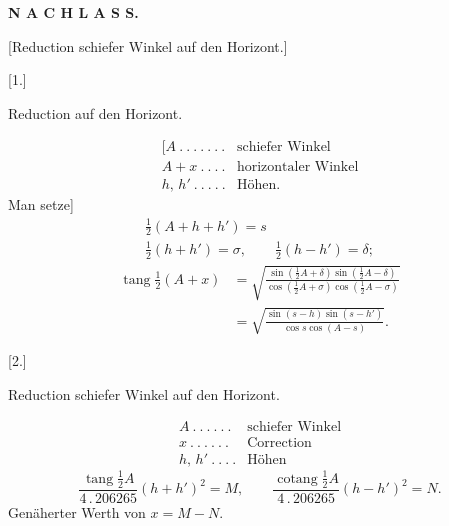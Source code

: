 \par\clearpage\null\clearpage
\begin{center}
{\Large\textbf{N A C H L A S S.}}\par\bigskip
{\large [Reduction schiefer Winkel auf den Horizont.]}\par\bigskip
{[}1.]\par\medskip
{\large Reduction auf den Horizont.}
\end{center}
\[
\begin{array}{ll}
{[}A\ .\ .\ .\ .\ .\ .\ .&\text{schiefer Winkel}\\
A+x\ .\ .\ .\ .&\text{horizontaler Winkel}\\
h,\,h'\ .\ .\ .\ .\ .&\text{Höhen.}
\end{array}
\]
\noindent Man setze]
\[
\begin{gathered}
\tfrac12(A+h+h')=s\\
\tfrac12(h+h')=\sigma,\qquad\tfrac12(h-h')=\delta;
\end{gathered}
\]
\[
\begin{aligned}
\operatorname{tang}\tfrac12(A+x)
&=\sqrt{\frac{\sin(\frac12A+\delta)\sin(\frac12A-\delta)}{\cos(\frac12A+\sigma)\cos(\frac12A-\sigma)}}\\
&=\sqrt{\frac{\sin(s-h)\sin(s-h')}{\cos s\cos(A-s)}}.
\end{aligned}
\]
\begin{center}[2.]\par\medskip
{\large Reduction schiefer Winkel auf den Horizont.}\end{center}
\[
\begin{array}{ll}
A\ .\ .\ .\ .\ .\ .&\text{schiefer Winkel}\\
x\ .\ .\ .\ .\ .\ .&\text{Correction}\\
h,\,h'\ .\ .\ .\ .&\text{Höhen}
\end{array}
\]
\[
\frac{\operatorname{tang}\frac12A}{4\,.\,206265}(h+h')^2=M,\qquad
\frac{\operatorname{cotang}\frac12A}{4\,.\,206265}(h-h')^2=N.
\]
\noindent Genäherter Werth von $x=M-N$.

